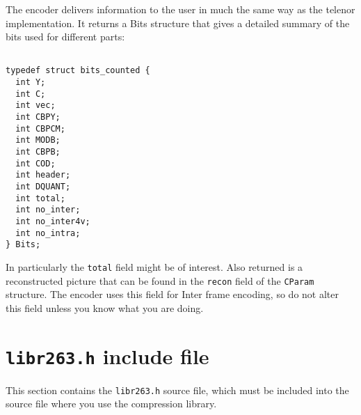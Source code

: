 \documentclass{article}
\begin{document}
The encoder delivers information to the user in much the same way as
the telenor implementation. It returns a Bits structure that gives a
detailed summary of the bits used for different parts:

\begin{verbatim}

typedef struct bits_counted {
  int Y;
  int C;
  int vec;
  int CBPY;
  int CBPCM;
  int MODB;
  int CBPB;
  int COD;
  int header;
  int DQUANT;
  int total;
  int no_inter;
  int no_inter4v;
  int no_intra;
} Bits;

\end{verbatim}

In particularly the {\tt total} field might be of interest. Also
returned is a reconstructed picture that can be found in the
\texttt{recon} field of the {\tt CParam} structure. The encoder uses
this field for Inter frame encoding, so do not alter this field unless
you know what you are doing.

\section{{\tt libr263.h} include file}

This section contains the {\tt libr263.h} source file, which must be
included into the source file where you use the compression library.
\end{document}
